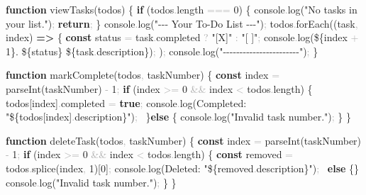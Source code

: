 \documentclass[
  justified,
  openright,
]{tufte-book}
\newcommand{\KeywordTok}[1]{\textcolor{CodeKeyword}{\textbf{#1}}}  %
\newcommand{\StringTok}[1]{\textcolor{CodeString}{#1}}              %
\newcommand{\CodeNumTok}[1]{\textcolor{CodeNumber}{#1}}             %
\newcommand{\CodeFuncTok}[1]{\textcolor{CodeKeyword}{#1}}           %
\newcommand{\CodeTypeTok}[1]{\textcolor{CodeType}{#1}}              %
\newcommand{\CodeAccentTok}[1]{\textcolor{CodeAccent}{#1}}          %
\newcommand{\OperatorTok}[1]{\textcolor{DarkGray}{#1}}              %
\newenvironment{Shaded}{%
  \begin{mdframed}[style=TufteCode]%
}{%
  \end{mdframed}%
}
\begin{document}
\begin{Shaded}
\begin{Highlighting}[]
\KeywordTok{function} \CodeFuncTok{viewTasks}(todos) \{
  \KeywordTok{if} (todos\OperatorTok{.}\CodeTypeTok{length} \OperatorTok{===} \CodeNumTok{0}) \{
    console\OperatorTok{.}\CodeFuncTok{log}(\StringTok{"No tasks in your list."})\OperatorTok{;}
    \KeywordTok{return}\OperatorTok{;}
  \}
  console\OperatorTok{.}\CodeFuncTok{log}(\StringTok{"{-}{-}{-} Your To{-}Do List {-}{-}{-}"})\OperatorTok{;}
  todos\OperatorTok{.}\CodeFuncTok{forEach}((task\OperatorTok{,} index) \KeywordTok{=\textgreater{}} \{
    \KeywordTok{const} status \OperatorTok{=} task\OperatorTok{.}\CodeTypeTok{completed} \OperatorTok{?} \StringTok{"[X]"} \OperatorTok{:} \StringTok{"[ ]"}\OperatorTok{;}
    console\OperatorTok{.}\CodeFuncTok{log}(\StringTok{\textasciigrave{}}\StringTok{\$\{}index \OperatorTok{+} \CodeNumTok{1}\StringTok{\}}\StringTok{. }\StringTok{\$\{}status\StringTok{\}}\StringTok{ }\StringTok{\$\{}task\OperatorTok{.}\CodeTypeTok{description}\StringTok{\}}\StringTok{\textasciigrave{}})\OperatorTok{;}
  )\OperatorTok{;}
  console\OperatorTok{.}\CodeFuncTok{log}(\StringTok{"{-}{-}{-}{-}{-}{-}{-}{-}{-}{-}{-}{-}{-}{-}{-}{-}{-}{-}{-}{-}{-}{-}{-}"})\OperatorTok{;}
\}
 
\KeywordTok{function} \CodeFuncTok{markComplete}(todos\OperatorTok{,} taskNumber) \{
  \KeywordTok{const} index \OperatorTok{=} \CodeAccentTok{parseInt}(taskNumber) \OperatorTok{{-}} \CodeNumTok{1}\OperatorTok{;}
  \KeywordTok{if} (index \OperatorTok{\textgreater{}=} \CodeNumTok{0} \OperatorTok{\&\&} index \OperatorTok{\textless{}} todos\OperatorTok{.}\CodeTypeTok{length}) \{
    todos[index]\OperatorTok{.}\CodeTypeTok{completed} \OperatorTok{=} \KeywordTok{true}\OperatorTok{;}
    console\OperatorTok{.}\CodeFuncTok{log}(\StringTok{\textasciigrave{}Completed: "}\StringTok{\$\{}todos[index]\OperatorTok{.}\CodeTypeTok{description}\StringTok{\}}\StringTok{"\textasciigrave{}})\OperatorTok{;}
  \ \}\KeywordTok{else} \{
    console\OperatorTok{.}\CodeFuncTok{log}(\StringTok{"Invalid task number."})\OperatorTok{;}
  \}
\}
 
\KeywordTok{function} \CodeFuncTok{deleteTask}(todos\OperatorTok{,} taskNumber) \{
  \KeywordTok{const} index \OperatorTok{=} \CodeAccentTok{parseInt}(taskNumber) \OperatorTok{{-}} \CodeNumTok{1}\OperatorTok{;}
  \KeywordTok{if} (index \OperatorTok{\textgreater{}=} \CodeNumTok{0} \OperatorTok{\&\&} index \OperatorTok{\textless{}} todos\OperatorTok{.}\CodeTypeTok{length}) \{
    \KeywordTok{const} removed \OperatorTok{=} todos\OperatorTok{.}\CodeFuncTok{splice}(index\OperatorTok{,} \CodeNumTok{1})[\CodeNumTok{0}]\OperatorTok{;}
    console\OperatorTok{.}\CodeFuncTok{log}(\StringTok{\textasciigrave{}Deleted: "}\StringTok{\$\{}removed\OperatorTok{.}\CodeTypeTok{description}\StringTok{\}}\StringTok{"\textasciigrave{}})\OperatorTok{;}
  \ \KeywordTok{else} \{\}
    console\OperatorTok{.}\CodeFuncTok{log}(\StringTok{"Invalid task number."})\OperatorTok{;}
  \}
\}
 

\end{Highlighting}
\end{Shaded}
\end{document}
